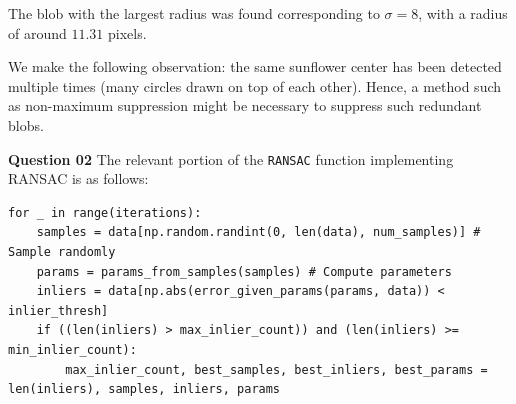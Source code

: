 \documentclass{article}[a4paper]
\begin{document}
	The blob with the largest radius was found corresponding to $\sigma = 8$, with a radius of around $11.31$ pixels.

	We make the following observation: the same sunflower center has been detected multiple times (many circles drawn on top of each other). Hence, a method such as non-maximum suppression might be necessary to suppress such redundant blobs.

    \textbf{Question 02} The relevant portion of the \lstinline|RANSAC| function implementing RANSAC is as follows:
	\begin{lstlisting}
for _ in range(iterations):
	samples = data[np.random.randint(0, len(data), num_samples)] # Sample randomly
	params = params_from_samples(samples) # Compute parameters
	inliers = data[np.abs(error_given_params(params, data)) < inlier_thresh]
	if ((len(inliers) > max_inlier_count)) and (len(inliers) >= min_inlier_count):
		max_inlier_count, best_samples, best_inliers, best_params = len(inliers), samples, inliers, params
	\end{lstlisting}
\end{document}
